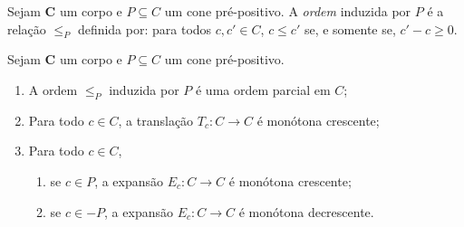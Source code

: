 \begin{definition}
Sejam $\bm C$ um corpo e $P \subseteq C$ um cone pré-positivo.  A \emph{ordem} induzida por $P$ é a relação $\leq_P$ definida por: para todos $c,c' \in C$, $c \leq c'$ se, e somente se, $c' - c \geq 0$.
\end{definition}

\begin{proposition}
Sejam $\bm C$ um corpo e $P \subseteq C$ um cone pré-positivo.
	\begin{enumerate}
	\item A ordem $\leq_P$ induzida por $P$ é uma ordem parcial em $C$;
	
	\item Para todo $c \in C$, a translação $T_c\colon C \to C$ é monótona crescente;
	
	\item Para todo $c \in C$, 
		\begin{enumerate}
		\item se $c \in P$, a expansão $E_c\colon C \to C$ é monótona crescente;
		
		\item se $c \in -P$, a expansão $E_c\colon C \to C$ é monótona decrescente.
		\end{enumerate}
	\end{enumerate}
\end{proposition}
